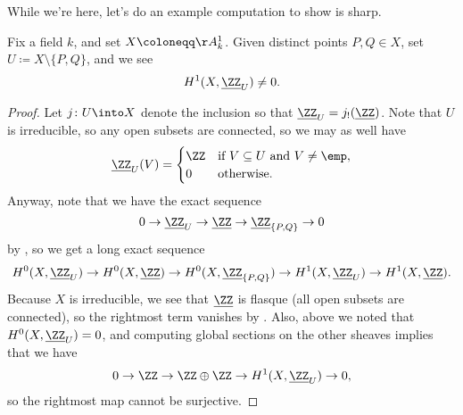 \documentclass[../notes.tex]{subfiles}
\begin{document}
While we're here, let's do an example computation to show  is sharp.
\begin{exe}
	Fix a field $k$, and set $X\coloneqq\AA^1_k$. Given distinct points $P,Q\in X$, set $U\coloneqq X\setminus\{P,Q\}$, and we see
	\[H^1(X,\underline{\ZZ}_U)\ne0.\]
\end{exe}
\begin{proof}
	Let $j\colon U\into X$ denote the inclusion so that $\underline{\ZZ}_U=j_!(\underline\ZZ)$. Note that $U$ is irreducible, so any open subsets are connected, so we may as well have
	\[\underline{\ZZ}_U(V)=\begin{cases}
		\ZZ & \text{if }V\subseteq U\text{ and }V\ne\emp, \\
		0 & \text{otherwise}.
	\end{cases}\]
	Anyway, note that we have the exact sequence
	\[0\to\underline{\ZZ}_U\to\underline\ZZ\to\underline\ZZ_{\{P,Q\}}\to0\]
	by , so we get a long exact sequence
	\[H^0(X,\underline\ZZ_U)\to H^0(X,\underline\ZZ)\to H^0(X,\underline\ZZ_{\{P,Q\}})\to H^1(X,\underline{\ZZ}_U)\to H^1(X,\underline{\ZZ}).\]
	Because $X$ is irreducible, we see that $\underline{\ZZ}$ is flasque (all open subsets are connected), so the rightmost term vanishes by . Also, above we noted that $H^0(X,\underline\ZZ_U)=0$, and computing global sections on the other sheaves implies that we have
	\[0\to\ZZ\to\ZZ\oplus\ZZ\to H^1(X,\underline{\ZZ}_U)\to0,\]
	so the rightmost map cannot be surjective.
\end{proof}
\end{document}
